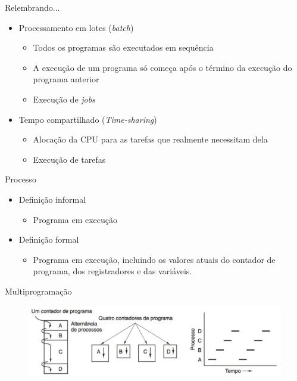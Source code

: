 \documentclass[aspectratio=169,
				xcolor=table]{beamer}
\begin{document}
	\begin{frame}{Relembrando...}
		\begin{itemize}
			\item Processamento em lotes (\textit{batch})
			\begin{itemize}
				\item Todos os programas são executados em sequência
				\item A execução de um programa só começa após o término da execução do programa anterior
				\item Execução de \textit{jobs}
			\end{itemize}
			\vspace{1em}
			\item Tempo compartilhado (\textit{Time-sharing})
			\begin{itemize}
				\item Alocação da CPU para as tarefas que realmente necessitam dela
				\item Execução de tarefas
			\end{itemize}
		\end{itemize}
	\end{frame}
	
	\begin{frame}{Processo}
		\begin{itemize}
			\item Definição informal
			\begin{itemize}
				\item Programa em execução
			\end{itemize}
			\vspace{1em}
			\item Definição formal
			\begin{itemize}
				\item Programa em execução, incluindo os valores atuais do contador de programa, dos registradores e das variáveis.  
			\end{itemize}
		\end{itemize}
	\end{frame}
	
	\begin{frame}{Multiprogramação}
	\begin{figure}[hbtp]
	\centering
	\includegraphics[keepaspectratio, width=.9\textwidth]{../figs/cap03/multiprog.png}
	\end{figure}
	
	\end{frame}
\end{document}
